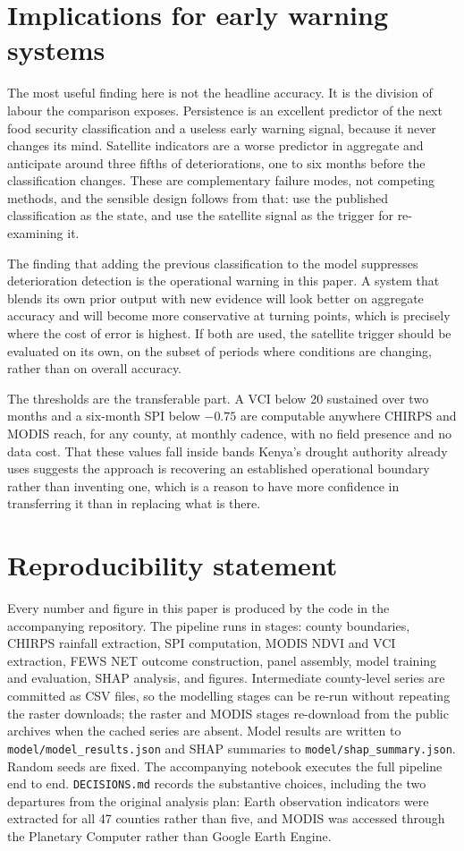 \documentclass[11pt]{article}
\begin{document}
\section{Implications for early warning systems}
\label{sec:implications}

The most useful finding here is not the headline accuracy. It is the division of
labour the comparison exposes. Persistence is an excellent predictor of the next
food security classification and a useless early warning signal, because it never
changes its mind. Satellite indicators are a worse predictor in aggregate and
anticipate around three fifths of deteriorations, one to six months before the
classification changes. These are complementary failure modes, not competing
methods, and the sensible design follows from that: use the published
classification as the state, and use the satellite signal as the trigger for
re-examining it.

The finding that adding the previous classification to the model suppresses
deterioration detection is the operational warning in this paper. A system that
blends its own prior output with new evidence will look better on aggregate
accuracy and will become more conservative at turning points, which is precisely
where the cost of error is highest. If both are used, the satellite trigger
should be evaluated on its own, on the subset of periods where conditions are
changing, rather than on overall accuracy.

The thresholds are the transferable part. A VCI below 20 sustained over two
months and a six-month SPI below $-0.75$ are computable anywhere CHIRPS and MODIS
reach, for any county, at monthly cadence, with no field presence and no data
cost. That these values fall inside bands Kenya's drought authority already uses
suggests the approach is recovering an established operational boundary rather
than inventing one, which is a reason to have more confidence in transferring it
than in replacing what is there.

\section*{Reproducibility statement}

Every number and figure in this paper is produced by the code in the
accompanying repository. The pipeline runs in stages: county boundaries,
CHIRPS rainfall extraction, SPI computation, MODIS NDVI and VCI extraction,
FEWS NET outcome construction, panel assembly, model training and evaluation,
SHAP analysis, and figures. Intermediate county-level series are committed as
CSV files, so the modelling stages can be re-run without repeating the raster
downloads; the raster and MODIS stages re-download from the public archives when
the cached series are absent. Model results are written to
\texttt{model/model\_results.json} and SHAP summaries to
\texttt{model/shap\_summary.json}. Random seeds are fixed. The accompanying
notebook executes the full pipeline end to end. \texttt{DECISIONS.md} records
the substantive choices, including the two departures from the original analysis
plan: Earth observation indicators were extracted for all 47 counties rather than
five, and MODIS was accessed through the Planetary Computer rather than Google
Earth Engine.
\end{document}
